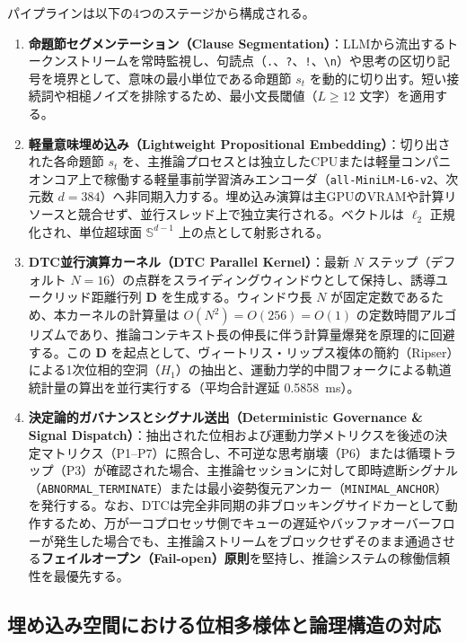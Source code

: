 \documentclass[11pt,a4paper]{article}
\begin{document}
パイプラインは以下の4つのステージから構成される。
\begin{enumerate}
    \item \textbf{命題節セグメンテーション（Clause Segmentation）}：LLMから流出するトークンストリームを常時監視し、句読点（\texttt{.}、\texttt{?}、\texttt{!}、\texttt{\textbackslash n}）や思考の区切り記号を境界として、意味の最小単位である命題節 $s_t$ を動的に切り出す。短い接続詞や相槌ノイズを排除するため、最小文長閾値（$L \ge 12$ 文字）を適用する。
    \item \textbf{軽量意味埋め込み（Lightweight Propositional Embedding）}：切り出された各命題節 $s_t$ を、主推論プロセスとは独立したCPUまたは軽量コンパニオンコア上で稼働する軽量事前学習済みエンコーダ（\texttt{all-MiniLM-L6-v2}、次元数 $d=384$）へ非同期入力する。埋め込み演算は主GPUのVRAMや計算リソースと競合せず、並行スレッド上で独立実行される。ベクトルは $\ell_2$ 正規化され、単位超球面 $\mathbb{S}^{d-1}$ 上の点として射影される。
    \item \textbf{DTC並行演算カーネル（DTC Parallel Kernel）}：最新 $N$ ステップ（デフォルト $N=16$）の点群をスライディングウィンドウとして保持し、誘導ユークリッド距離行列 $\mathbf{D}$ を生成する。ウィンドウ長 $N$ が固定定数であるため、本カーネルの計算量は $O(N^2) = O(256) = O(1)$ の定数時間アルゴリズムであり、推論コンテキスト長の伸長に伴う計算量爆発を原理的に回避する。この $\mathbf{D}$ を起点として、ヴィートリス・リップス複体の簡約（Ripser）による1次位相的空洞（$H_1$）の抽出と、運動力学的中間フォークによる軌道統計量の算出を並行実行する（平均合計遅延 0.5858~ms）。
    \item \textbf{決定論的ガバナンスとシグナル送出（Deterministic Governance \& Signal Dispatch）}：抽出された位相および運動力学メトリクスを後述の決定マトリクス（P1--P7）に照合し、不可逆な思考崩壊（P6）または循環トラップ（P3）が確認された場合、主推論セッションに対して即時遮断シグナル（\texttt{ABNORMAL\_TERMINATE}）または最小姿勢復元アンカー（\texttt{MINIMAL\_ANCHOR}）を発行する。なお、DTCは完全非同期の非ブロッキングサイドカーとして動作するため、万が一コプロセッサ側でキューの遅延やバッファオーバーフローが発生した場合でも、主推論ストリームをブロックせずそのまま通過させる\textbf{フェイルオープン（Fail-open）原則}を堅持し、推論システムの稼働信頼性を最優先する。
\end{enumerate}

\subsection{埋め込み空間における位相多様体と論理構造の対応}
\end{document}
